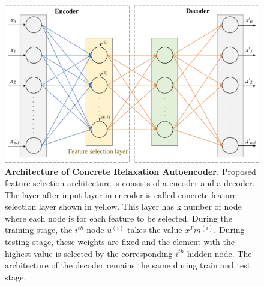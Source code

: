 \documentclass{bioinfo}
\begin{document}
\begin{figure}[h!]
    \centering
    \includegraphics[scale=0.5]{fig/architecture.pdf}
    \caption{\textbf{Architecture of Concrete Relaxation Autoencoder.} Proposed feature selection architecture is consists of a encoder and a decoder. The layer after input layer in encoder is called concrete feature selection layer shown in yellow. This layer has k number of node where each node is for each feature to be selected. During the training stage, the $i^{th}$ node $u^{(i)}$ takes the value $x^Tm^{(i)}$.
During testing stage, these weights are fixed and the element with the highest value is selected by the corresponding $i^{th}$ hidden node.
The architecture of the decoder remains the same during train and test stage.}
    \label{fig:architecture}
\end{figure}
\end{document}
